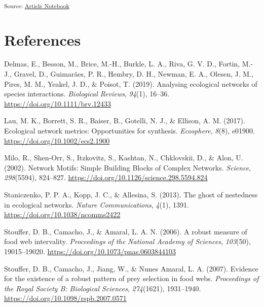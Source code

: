 \documentclass[
]{article}
\newlength{\cslhangindent}
\newenvironment{CSLReferences}[2] %
 {\begin{list}{}{%
  \setlength{\itemindent}{0pt}
  \setlength{\leftmargin}{0pt}
  \setlength{\parsep}{0pt}
  \ifodd #1
   \setlength{\leftmargin}{\cslhangindent}
   \setlength{\itemindent}{-1\cslhangindent}
  \fi
  \setlength{\itemsep}{#2\baselineskip}}}
 {\end{list}}
\begin{document}
\textsubscript{Source:
\href{https://BecksLab.github.io/ms_feature_selection/index.qmd.html}{Article
Notebook}}

\section*{References}\label{references}

\label{refs}
\begin{CSLReferences}{1}{0}
Delmas, E., Besson, M., Brice, M.-H., Burkle, L. A., Riva, G. V. D.,
Fortin, M.-J., Gravel, D., Guimarães, P. R., Hembry, D. H., Newman, E.
A., Olesen, J. M., Pires, M. M., Yeakel, J. D., \& Poisot, T. (2019).
Analysing ecological networks of species interactions. \emph{Biological
Reviews}, \emph{94}(1), 16--36. \url{https://doi.org/10.1111/brv.12433}

Lau, M. K., Borrett, S. R., Baiser, B., Gotelli, N. J., \& Ellison, A.
M. (2017). Ecological network metrics: Opportunities for synthesis.
\emph{Ecosphere}, \emph{8}(8), e01900.
\url{https://doi.org/10.1002/ecs2.1900}

Milo, R., Shen-Orr, S., Itzkovitz, S., Kashtan, N., Chklovskii, D., \&
Alon, U. (2002). Network {Motifs}: {Simple Building Blocks} of {Complex
Networks}. \emph{Science}, \emph{298}(5594), 824--827.
\url{https://doi.org/10.1126/science.298.5594.824}

Staniczenko, P. P. A., Kopp, J. C., \& Allesina, S. (2013). The ghost of
nestedness in ecological networks. \emph{Nature Communications},
\emph{4}(1), 1391. \url{https://doi.org/10.1038/ncomms2422}

Stouffer, D. B., Camacho, J., \& Amaral, L. A. N. (2006). A robust
measure of food web intervality. \emph{Proceedings of the National
Academy of Sciences}, \emph{103}(50), 19015--19020.
\url{https://doi.org/10.1073/pnas.0603844103}

Stouffer, D. B., Camacho, J., Jiang, W., \& Nunes Amaral, L. A. (2007).
Evidence for the existence of a robust pattern of prey selection in food
webs. \emph{Proceedings of the Royal Society B: Biological Sciences},
\emph{274}(1621), 1931--1940.
\url{https://doi.org/10.1098/rspb.2007.0571}


\end{CSLReferences}
\end{document}
